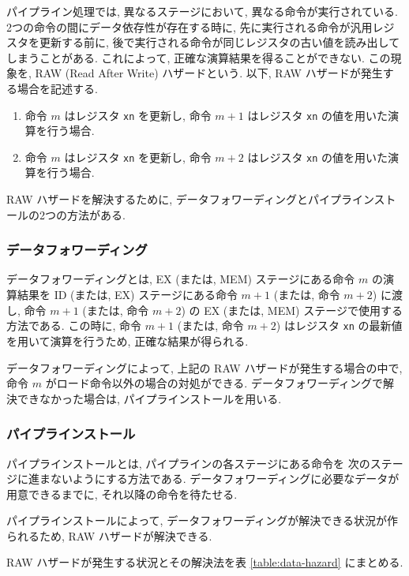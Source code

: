 \documentclass[../specifications]{subfiles}
\begin{document}
  パイプライン処理では, 異なるステージにおいて, 異なる命令が実行されている.
  2つの命令の間にデータ依存性が存在する時に, 
  先に実行される命令が汎用レジスタを更新する前に, 
  後で実行される命令が同じレジスタの古い値を読み出してしまうことがある.
  これによって, 正確な演算結果を得ることができない.
  この現象を, RAW (Read After Write) ハザードという.
  以下, RAW ハザードが発生する場合を記述する.

  \begin{enumerate}
    \item 命令 $m$ はレジスタ \verb|xn| を更新し, 
    命令 $m+1$ はレジスタ \verb|xn| の値を用いた演算を行う場合.

    \item 命令 $m$ はレジスタ \verb|xn| を更新し, 
    命令 $m+2$ はレジスタ \verb|xn| の値を用いた演算を行う場合.
  \end{enumerate}

  RAW ハザードを解決するために, データフォワーディングとパイプラインストールの2つの方法がある.

  \subsubsection{データフォワーディング}
  データフォワーディングとは, EX (または, MEM) ステージにある命令 $m$ の演算結果を
  ID (または, EX) ステージにある命令 $m+1$ (または, 命令 $m+2$) に渡し, 
  命令 $m+1$ (または, 命令 $m+2$) の EX (または, MEM) ステージで使用する方法である.
  この時に, 命令 $m+1$ (または, 命令 $m+2$) はレジスタ \verb|xn| の最新値
  を用いて演算を行うため, 正確な結果が得られる.

  データフォワーディングによって, 上記の RAW ハザードが発生する場合の中で, 
  命令 $m$ がロード命令以外の場合の対処ができる.
  データフォワーディングで解決できなかった場合は, 
  パイプラインストールを用いる.

  \subsubsection{パイプラインストール}
  パイプラインストールとは, パイプラインの各ステージにある命令を
  次のステージに進まないようにする方法である.
  データフォワーディングに必要なデータが用意できるまでに, 
  それ以降の命令を待たせる.
  
  パイプラインストールによって, 
  データフォワーディングが解決できる状況が作られるため, 
  RAW ハザードが解決できる.

  RAW ハザードが発生する状況とその解決法を表 \ref{table:data-hazard} にまとめる.
\end{document}
